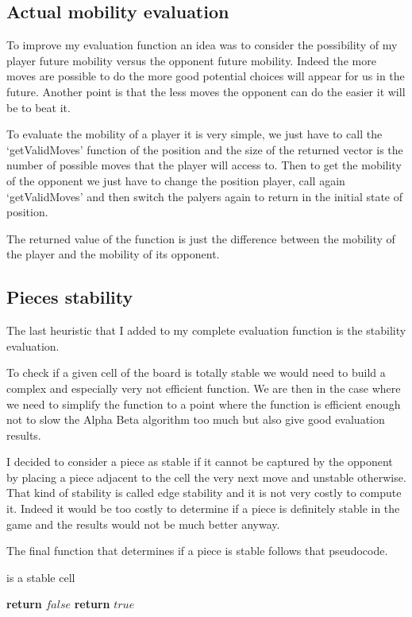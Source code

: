 \subsection{Actual mobility evaluation}

To improve my evaluation function an idea was to consider the possibility of my player future mobility versus the opponent future mobility.
Indeed the more moves are possible to do the more good potential choices will appear for us in the future.
Another point is that the less moves the opponent can do the easier it will be to beat it.

To evaluate the mobility of a player it is very simple, we just have to call the `getValidMoves' function of the position and the size of the returned vector is the number of possible moves that the player will access to.
Then to get the mobility of the opponent we just have to change the position player, call again `getValidMoves' and then switch the palyers again to return in the initial state of position.

The returned value of the function is just the difference between the mobility of the player and the mobility of its opponent.

\subsection{Pieces stability}

The last heuristic that I added to my complete evaluation function is the stability evaluation.

To check if a given cell of the board is totally stable we would need to build a complex and especially very not efficient function.
We are then in the case where we need to simplify the function to a point where the function is efficient enough not to slow the Alpha Beta algorithm too much but also give good evaluation results.

I decided to consider a piece as stable if it cannot be captured by the opponent by placing a piece adjacent to the cell the very next move and unstable otherwise.
That kind of stability is called edge stability and it is not very costly to compute it.
Indeed it would be too costly to determine if a piece is definitely stable in the game and the results would not be much better anyway.

The final function that determines if a piece is stable follows that pseudocode.

\FloatBarrier
\begin{algorithm}
    \caption{is a stable cell}
    \begin{algorithmic}[1]
                        \State \textbf{return} $false$
                    \EndIf
                \EndIf
            \EndFor
            \State \textbf{return} $true$
        \EndProcedure
    \end{algorithmic}
\end{algorithm}
\FloatBarrier

